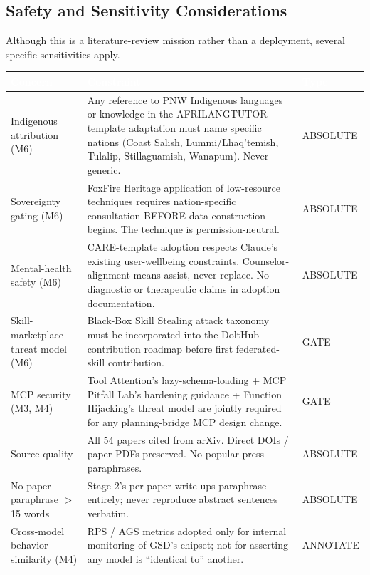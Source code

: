 \documentclass[11pt,letterpaper]{article}
\newcommand{\tableheader}[1]{\textbf{\sffamily\textcolor{white}{#1}}}
\begin{document}
\subsection{Safety and Sensitivity Considerations}

Although this is a literature-review mission rather than a deployment, several specific sensitivities apply.

\begin{center}
\begin{tabularx}{\textwidth}{L{4cm}XC{2.5cm}}
\toprule
{}
\tableheader{Concern} & \tableheader{Constraint} & \tableheader{Type} \\
\midrule
Indigenous attribution (M6) & Any reference to PNW Indigenous languages or knowledge in the AFRILANGTUTOR-template adaptation must name specific nations (Coast Salish, Lummi/Lhaq'temish, Tulalip, Stillaguamish, Wanapum). Never generic. & ABSOLUTE \\
Sovereignty gating (M6) & FoxFire Heritage application of low-resource techniques requires nation-specific consultation BEFORE data construction begins. The technique is permission-neutral. & ABSOLUTE \\
Mental-health safety (M6) & CARE-template adoption respects Claude's existing user-wellbeing constraints. Counselor-alignment means assist, never replace. No diagnostic or therapeutic claims in adoption documentation. & ABSOLUTE \\
Skill-marketplace threat model (M6) & Black-Box Skill Stealing attack taxonomy must be incorporated into the DoltHub contribution roadmap before first federated-skill contribution. & GATE \\
MCP security (M3, M4) & Tool Attention's lazy-schema-loading + MCP Pitfall Lab's hardening guidance + Function Hijacking's threat model are jointly required for any planning-bridge MCP design change. & GATE \\
Source quality & All 54 papers cited from arXiv. Direct DOIs / paper PDFs preserved. No popular-press paraphrases. & ABSOLUTE \\
No paper paraphrase $>$15 words & Stage 2's per-paper write-ups paraphrase entirely; never reproduce abstract sentences verbatim. & ABSOLUTE \\
Cross-model behavior similarity (M4) & RPS / AGS metrics adopted only for internal monitoring of GSD's chipset; not for asserting any model is ``identical to'' another. & ANNOTATE \\
\bottomrule
\end{tabularx}
\end{center}
\end{document}
